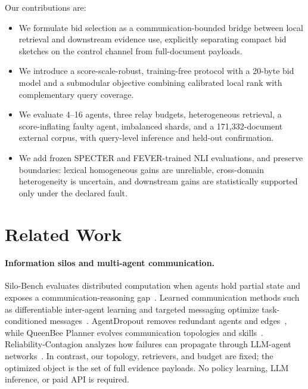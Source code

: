 \documentclass[sigconf]{acmart}
\begin{document}
Our contributions are:
\begin{itemize}
  \item We formulate bid selection as a communication-bounded bridge between local retrieval and downstream evidence use, explicitly separating compact bid sketches on the control channel from full-document payloads.
  \item We introduce a score-scale-robust, training-free protocol with a 20-byte bid model and a submodular objective combining calibrated local rank with complementary query coverage.
  \item We evaluate 4--16 agents, three relay budgets, heterogeneous retrieval, a score-inflating faulty agent, imbalanced shards, and a 171,332-document external corpus, with query-level inference and held-out confirmation.
  \item We add frozen SPECTER and FEVER-trained NLI evaluations, and preserve boundaries: lexical homogeneous gains are unreliable, cross-domain heterogeneity is uncertain, and downstream gains are statistically supported only under the declared fault.
\end{itemize}

\section{Related Work}

\paragraph{Information silos and multi-agent communication.}
Silo-Bench evaluates distributed computation when agents hold partial state and exposes a communication-reasoning gap~\cite{zhang2026silobench}. Learned communication methods such as differentiable inter-agent learning and targeted messaging optimize task-conditioned messages~\cite{foerster2016communicate,das2019tarmac}. AgentDropout removes redundant agents and edges~\cite{wang2025agentdropout}, while QueenBee Planner evolves communication topologies and skills~\cite{tian2026queenbee}. Reliability-Contagion analyzes how failures can propagate through LLM-agent networks~\cite{niu2026reliability}. In contrast, our topology, retrievers, and budget are fixed; the optimized object is the set of full evidence payloads. No policy learning, LLM inference, or paid API is required.
\end{document}
